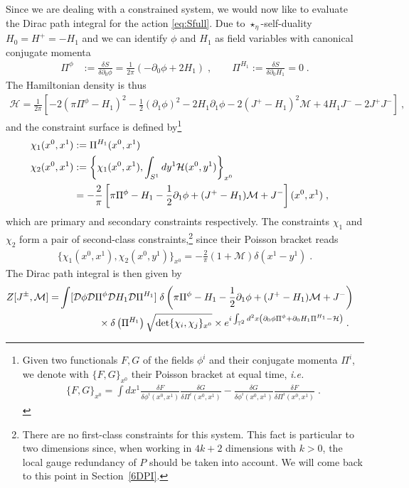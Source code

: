 \documentclass[11pt]{article}
\numberwithin{equation}{section}
\begin{document}
Since we are dealing with a constrained system, we  would now like to evaluate the Dirac path integral for the action \eqref{eq:Sfull}. 
Due to $\star_\eta$-self-duality $H_0=H^+=-H_1$ and we can identify $\phi$ and $H_1$ as field variables with canonical conjugate momenta 
\begin{align}
\Pi^\phi&:=\frac{\delta S}{\delta \partial_0\phi}=\frac1{2\pi}\left(-\partial_0\phi+2H_1\right)\;, \qquad \Pi^{H_1}:=\frac{\delta S}{\delta \partial_0 H_1}=0\;.
\end{align}
The Hamiltonian density is thus
\begin{align}
\mathcal{H}=\frac1{2\pi}\left[-2 (\pi\Pi^\phi-H_1)^2-\frac12 (\partial_1 \phi)^2-2H_1\partial_1\phi-2(J^+-H_1)^2\mathcal{M}+4H_1J^--2J^+J^-\right]\ ,
\end{align}
and the constraint surface is defined by\footnote{Given two functionals $F,G$ of the fields $\phi^i$ and their conjugate momenta $\Pi^i$, we denote with $\{F,G\}_{x^0}$ their Poisson bracket at equal time, {\it i.e.}
\begin{align}
    \{F,G\}_{x^0}=\int dx^1 \frac{\delta F}{\delta \phi^i(x^0,x^1) } \frac{\delta G}{\delta \Pi^i(x^0,x^1)}- \frac{\delta G}{\delta \phi^i(x^0,x^1) }\frac{\delta F}{\delta \Pi^i(x^0,x^1)}\;.
\end{align}
}   
\begin{align}
\chi_1(x^0,x^1)& :=\Pi^{H_1}(x^0,x^1)    \cr
\chi_2(x^0,x^1) &:=\left\{\chi_1(x^0,x^1),\int_{S^1}dy^1\mathcal H(x^0,y^1)\right\}_{x^0}\cr
&=-\frac2\pi\left[\pi\Pi^\phi-H_1-\frac12\partial_1 \phi+(J^+-H_1)\mathcal{M}+J^-\right](x^0,x^1)\;,
\end{align}
 which are primary and secondary constraints respectively. The constraints $\chi_1$ and $\chi_2$ form a pair of second-class constraints,\footnote{There are no first-class constraints for this system. This fact is particular to two dimensions since, when working in $4k+2$ dimensions with $k>0$, the local gauge redundancy of $P$ should be taken into account. We will come back to this point in Section~\ref{6DPI}.} since their Poisson bracket reads 
\begin{align}
\{\chi_1(x^0,x^1),\chi_2( x^0, y^1)\}_{x^0}=-\frac2\pi(1+\mathcal M)\delta(x^1-y^1)\;.
\end{align}
The Dirac path integral is then given by  \cite{Senjanovic:1976br,Henneaux:1992ig}
\begin{align}
Z[J^\pm,\mathcal M ]=&\int[\mathcal D\phi\mathcal D \Pi^\phi\mathcal D H_1\mathcal D \Pi^{H_1}]\;\delta\left(\pi\Pi^\phi-H_1-\frac12\partial_1 \phi+(J^+-H_1)\mathcal{M}+J^-\right)\cr
&\qquad\qquad \times\delta\left(\Pi^{H_1}\right)\sqrt{\det\{\chi_i,\chi_j\}_{x^0}}\times e^{i\int_{\mathbb T^2}d^2 x\left(\partial_0\phi \Pi^\phi+\partial_0H_1\Pi^{H_1}-\mathcal H\right)}\;.
\end{align}
\end{document}
